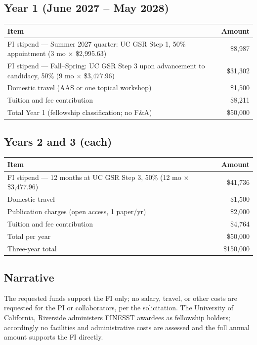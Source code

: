 \documentclass[12pt,letterpaper]{article}
\begin{document}
\subsection*{Year 1 (June 2027 -- May 2028)}
\begin{center}
\begin{tabular}{lr}
\toprule
Item & Amount \\
\midrule
FI stipend --- Summer 2027 quarter: UC GSR Step 1, 50\% appointment
  (3 mo $\times$ \$2,995.63) & \$8,987 \\
FI stipend --- Fall--Spring: UC GSR Step 3 upon advancement to
  candidacy, 50\% (9 mo $\times$ \$3,477.96) & \$31,302 \\
Domestic travel (AAS or one topical workshop) & \$1,500 \\
Tuition and fee contribution & \$8,211 \\
\midrule
Total Year 1 (fellowship classification; no F\&A) & \$50,000 \\
\bottomrule
\end{tabular}
\end{center}

\subsection*{Years 2 and 3 (each)}
\begin{center}
\begin{tabular}{lr}
\toprule
Item & Amount \\
\midrule
FI stipend --- 12 months at UC GSR Step 3, 50\%
  (12 mo $\times$ \$3,477.96) & \$41,736 \\
Domestic travel & \$1,500 \\
Publication charges (open access, 1 paper/yr) & \$2,000 \\
Tuition and fee contribution & \$4,764 \\
\midrule
Total per year & \$50,000 \\
Three-year total & \$150,000 \\
\bottomrule
\end{tabular}
\end{center}

\subsection*{Narrative}
The requested funds support the FI only; no salary, travel, or other
costs are requested for the PI or collaborators, per the solicitation.
The University of California, Riverside administers FINESST awardees as
fellowship holders; accordingly no facilities and administrative costs
are assessed and the full annual amount supports the FI directly.
\end{document}
